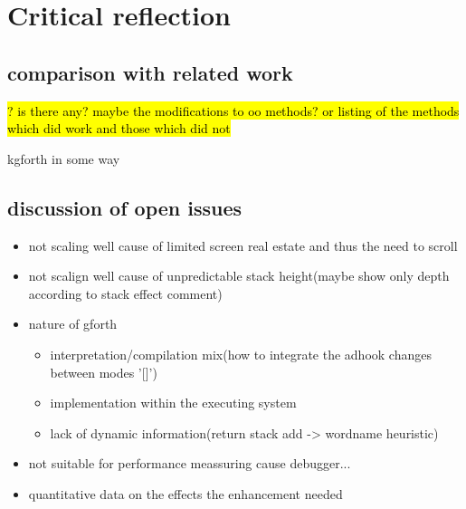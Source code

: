 \chapter{Critical reflection}

\section{comparison with related work}

\hl{? is there any? maybe the modifications to oo methods? or listing of the methods which did work and those which did not}

kgforth in some way

\section{discussion of open issues}

\begin{itemize}
\item not scaling well cause of limited screen real estate and thus the need to scroll
\item not scalign well cause of unpredictable stack height(maybe show only depth according to stack effect comment)
\item nature of gforth
	\begin{itemize}
	\item interpretation/compilation mix(how to integrate the adhook changes between modes '[]')
	\item implementation within the executing system
	\item lack of dynamic information(return stack add -> wordname heuristic)
	\end{itemize}
\item not suitable for performance meassuring cause debugger...
\item quantitative data on the effects the enhancement needed
\end{itemize}
